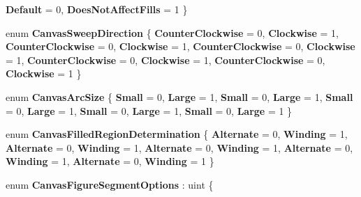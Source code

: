 \begin{DoxyCompactItemize}
\newline
{\bfseries Default} = 0, 
{\bfseries Does\+Not\+Affect\+Fills} = 1
 \}
\item 
\mbox{\label{namespace_microsoft_1_1_graphics_1_1_canvas_1_1_geometry_ac9b0f6a16960b87589d16512e46f64c1}} 
enum {\bfseries Canvas\+Sweep\+Direction} \{ \newline
{\bfseries Counter\+Clockwise} = 0, 
{\bfseries Clockwise} = 1, 
{\bfseries Counter\+Clockwise} = 0, 
{\bfseries Clockwise} = 1, 
\newline
{\bfseries Counter\+Clockwise} = 0, 
{\bfseries Clockwise} = 1, 
{\bfseries Counter\+Clockwise} = 0, 
{\bfseries Clockwise} = 1, 
\newline
{\bfseries Counter\+Clockwise} = 0, 
{\bfseries Clockwise} = 1
 \}
\item 
\mbox{\label{namespace_microsoft_1_1_graphics_1_1_canvas_1_1_geometry_a583cc3265f037d53e69808d04a785d9a}} 
enum {\bfseries Canvas\+Arc\+Size} \{ \newline
{\bfseries Small} = 0, 
{\bfseries Large} = 1, 
{\bfseries Small} = 0, 
{\bfseries Large} = 1, 
\newline
{\bfseries Small} = 0, 
{\bfseries Large} = 1, 
{\bfseries Small} = 0, 
{\bfseries Large} = 1, 
\newline
{\bfseries Small} = 0, 
{\bfseries Large} = 1
 \}
\item 
\mbox{\label{namespace_microsoft_1_1_graphics_1_1_canvas_1_1_geometry_af9fb7e1db5b8bf2c9334f51491270043}} 
enum {\bfseries Canvas\+Filled\+Region\+Determination} \{ \newline
{\bfseries Alternate} = 0, 
{\bfseries Winding} = 1, 
{\bfseries Alternate} = 0, 
{\bfseries Winding} = 1, 
\newline
{\bfseries Alternate} = 0, 
{\bfseries Winding} = 1, 
{\bfseries Alternate} = 0, 
{\bfseries Winding} = 1, 
\newline
{\bfseries Alternate} = 0, 
{\bfseries Winding} = 1
 \}
\item 
\mbox{\label{namespace_microsoft_1_1_graphics_1_1_canvas_1_1_geometry_ada89e04bb167c7a96061368c1d6cc2ab}} 
enum {\bfseries Canvas\+Figure\+Segment\+Options} \+: uint \{ \newline

\end{DoxyCompactItemize}
